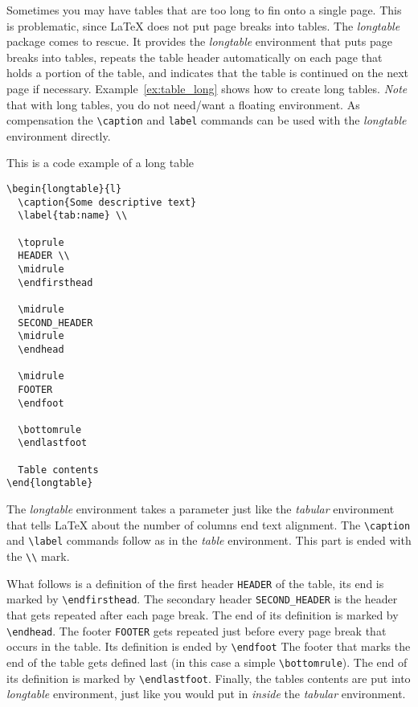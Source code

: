 Sometimes you may have tables that are too long to fin onto a single page.
This is problematic, since \LaTeX{} does not put page breaks into tables.
The \emph{longtable} package comes to rescue.
It provides the \emph{longtable} environment that puts page breaks into tables,
repeats the table header automatically on each page that holds a portion of the
table, and indicates that the table is continued on the next page if necessary.
Example~\ref{ex:table_long} shows how to create long tables.
\emph{Note} that with long tables, you do not need/want a floating environment.
As compensation the \verb+\caption+ and \verb+label+ commands can be used with
the \emph{longtable} environment directly.
\begin{example}
\label{ex:table_long}
This is a code example of a long table
\begin{verbatim}
\begin{longtable}{l}
  \caption{Some descriptive text}
  \label{tab:name} \\

  \toprule
  HEADER \\
  \midrule
  \endfirsthead

  \midrule
  SECOND_HEADER
  \midrule
  \endhead

  \midrule
  FOOTER
  \endfoot

  \bottomrule
  \endlastfoot

  Table contents
\end{longtable}
\end{verbatim}

The \emph{longtable} environment takes a parameter just like the \emph{tabular}
environment that tells \LaTeX{} about the number of columns end text alignment.
The \verb+\caption+ and \verb+\label+ commands follow as in the \emph{table}
environment.
This part is ended with the \verb+\\+ mark.

What follows is a definition of the first header \verb+HEADER+ of the table,
its end is marked by \verb+\endfirsthead+.
The secondary header \verb+SECOND_HEADER+ is the header that gets repeated
after each page break.
The end of its definition is marked by \verb+\endhead+.
The footer \verb+FOOTER+ gets repeated just before every page break that occurs
in the table.
Its definition is ended by \verb+\endfoot+
The footer that marks the end of the table gets defined last (in this case a
simple \verb+\bottomrule+).
The end of its definition is marked by \verb+\endlastfoot+.
Finally, the tables contents are put into \emph{longtable} environment, just
like you would put in \emph{inside} the \emph{tabular} environment.
\end{example}
